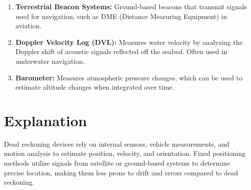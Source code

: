 \documentclass{article}
\begin{document}
\begin{enumerate}
    \item \textbf{Terrestrial Beacon Systems:} Ground-based beacons that transmit signals used for navigation, such as DME (Distance Measuring Equipment) in aviation.
 \item \textbf{Doppler Velocity Log (DVL):} Measures water velocity by analyzing the Doppler shift of acoustic signals reflected off the seabed. Often used in underwater navigation.
    
    \item \textbf{Barometer:} Measures atmospheric pressure changes, which can be used to estimate altitude changes when integrated over time.
    
\end{enumerate}

\section*{Explanation}
Dead reckoning devices rely on internal sensors, vehicle measurements, and motion analysis to estimate position, velocity, and orientation. Fixed positioning methods utilize signals from satellite or ground-based systems to determine precise location, making them less prone to drift and errors compared to dead reckoning.

\end{document}
